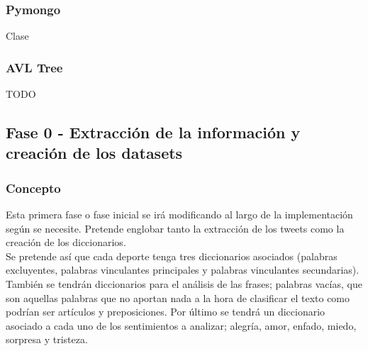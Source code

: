 \documentclass[../all.tex]{subfiles}
\begin{document}
    \subsubsection{Pymongo}
        {\color{red} 
            Clase
        }
    \subsubsection{AVL Tree}
        {\color{red} 
            TODO
        }
    
\newpage
\subsection{Fase 0 - Extracción de la información y creación de los datasets}
    \subsubsection{Concepto}
        Esta primera fase o fase inicial se irá modificando al largo de la implementación según se necesite. Pretende englobar tanto la extracción de los tweets como la creación de los diccionarios.\\
        Se pretende así que cada deporte tenga tres diccionarios asociados (palabras excluyentes, palabras vinculantes principales y palabras vinculantes secundarias). También se tendrán diccionarios para el análisis de las frases; palabras vacías, que son aquellas palabras que no aportan nada a la hora de clasificar el texto como podrían ser artículos y preposiciones. Por último se tendrá un diccionario asociado a cada uno de los sentimientos a analizar; alegría, amor, enfado, miedo, sorpresa y tristeza.
        
\end{document}
